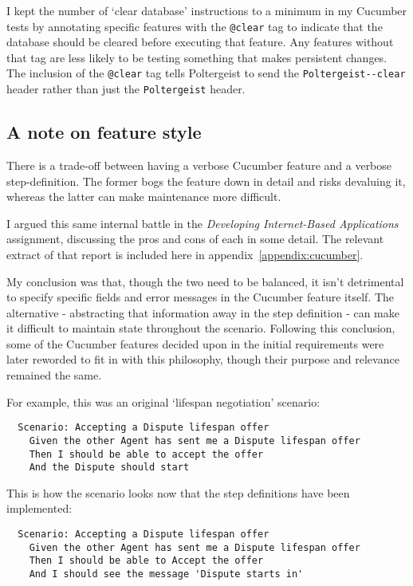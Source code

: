I kept the number of `clear database' instructions to a minimum in my Cucumber tests by annotating specific features with the \lstinline{@clear} tag to indicate that the database should be cleared before executing that feature. Any features without that tag are less likely to be testing something that makes persistent changes. The inclusion of the \lstinline{@clear} tag tells Poltergeist to send the \lstinline{Poltergeist--clear} header rather than just the \lstinline{Poltergeist} header.

\subsection{A note on feature style}

There is a trade-off between having a verbose Cucumber feature and a verbose step-definition. The former bogs the feature down in detail and risks devaluing it, whereas the latter can make maintenance more difficult.

I argued this same internal battle in the \emph{Developing Internet-Based Applications} assignment, discussing the pros and cons of each in some detail. The relevant extract of that report is included here in appendix~\ref{appendix:cucumber}.

My conclusion was that, though the two need to be balanced, it isn't detrimental to specify specific fields and error messages in the Cucumber feature itself. The alternative - abstracting that information away in the step definition - can make it difficult to maintain state throughout the scenario. Following this conclusion, some of the Cucumber features decided upon in the initial requirements were later reworded to fit in with this philosophy, though their purpose and relevance remained the same.

For example, this was an original `lifespan negotiation' scenario:

\begin{lstlisting}
  Scenario: Accepting a Dispute lifespan offer
    Given the other Agent has sent me a Dispute lifespan offer
    Then I should be able to accept the offer
    And the Dispute should start
\end{lstlisting}

This is how the scenario looks now that the step definitions have been implemented:

\begin{lstlisting}
  Scenario: Accepting a Dispute lifespan offer
    Given the other Agent has sent me a Dispute lifespan offer
    Then I should be able to Accept the offer
    And I should see the message 'Dispute starts in'
\end{lstlisting}

